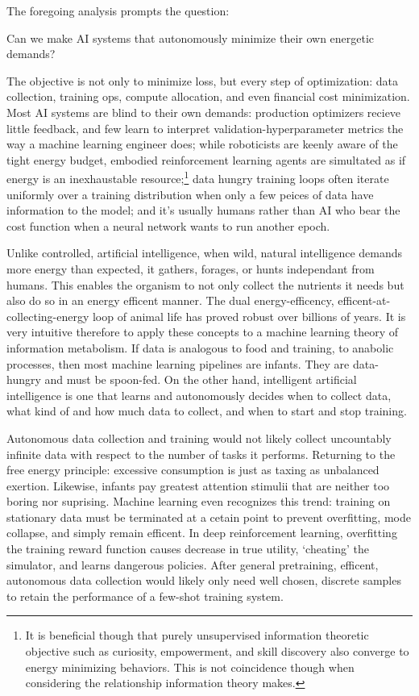 The foregoing analysis prompts the question:

\begin{center}
Can we make AI systems that autonomously minimize their own energetic demands?
\end{center}

The objective is not only to minimize loss, but every step of optimization: data collection, training ops, compute allocation, and even financial cost minimization. Most AI systems are blind to their own demands: production optimizers recieve little feedback, and few learn to interpret validation-hyperparameter metrics the way a machine learning engineer does; while roboticists are keenly aware of the  tight energy budget, embodied reinforcement learning agents are simultated as if energy is an inexhaustable resource;\footnote{It is beneficial though that purely unsupervised information theoretic objective such as curiosity, empowerment, and skill discovery also converge to energy minimizing behaviors. This is not coincidence though when considering the relationship information theory makes.} data hungry training loops often iterate uniformly over a training distribution when only a few peices of data have information to the model; and it's usually humans rather than AI who bear the cost function when a neural network wants to run another epoch. 

Unlike controlled, artificial intelligence, when wild, natural intelligence demands more energy than expected, it gathers, forages, or hunts independant from humans. This enables the organism to not only collect the nutrients it needs but also do so in an energy efficent manner. The dual energy-efficency, efficent-at-collecting-energy loop of animal life has proved robust over billions of years. It is very intuitive therefore to apply these concepts to a machine learning theory of information metabolism. If data is analogous to food and training, to anabolic processes, then most machine learning pipelines are infants. They are data-hungry and must be spoon-fed. On the other hand, intelligent artificial intelligence is one that learns and autonomously decides when to collect data, what kind of and how much data to collect, and when to start and stop training. 

Autonomous data collection and training would not likely collect uncountably infinite data with respect to the number of tasks it performs. Returning to the free energy principle: excessive consumption is just as taxing as unbalanced exertion. Likewise, infants pay greatest attention stimulii that are neither too boring nor suprising. Machine learning even recognizes this trend: training on stationary data must be terminated at a cetain point to prevent overfitting, mode collapse, and simply remain efficent. In deep reinforcement learning, overfitting the training reward function causes decrease in true utility, `cheating' the simulator, and learns dangerous policies. After general pretraining, efficent, autonomous data collection would likely only need well chosen, discrete samples to retain the performance of a few-shot training system. 

